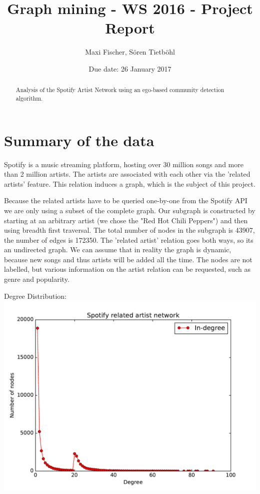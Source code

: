 \documentclass[11pt,a4paper,onecolumn,notitlepage]{article}
\begin{document}
\title{Graph mining - WS 2016 - Project Report}




\date{Due date: 26 January 2017}

\author{
Maxi Fischer, S\"oren Tietb\"ohl\\ 
}


\maketitle



\begin{abstract}
Analysis of the Spotify Artist Network using an ego-based community detection algorithm.
\end{abstract}


\section{Summary of the data}

Spotify is a music streaming platform, hosting over 30 million songs and more than 2 million artists. The artists are associated with each other via the 'related artists' feature. This relation induces a graph, which is the subject of this project.

Because the related artists have to be queried one-by-one from the Spotify API we are only using a subset of the complete graph. Our subgraph is constructed by starting at an arbitrary artist (we chose the "Red Hot Chili Peppers") and then using breadth first traversal. The total number of nodes in the subgraph is 43907, the number of edges is 172350. The 'related artist' relation goes both ways, so its an undirected graph. We can assume that in reality the graph is dynamic, because new songs and thus artists will be added all the time. The nodes are not labelled, but various information on the artist relation can be requested, such as genre and popularity.

Degree Distribution: 
\includegraphics[scale=0.4]{spotify_degree_distribution.pdf}
\end{document}
